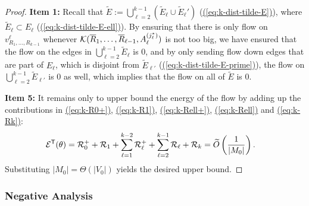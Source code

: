 \documentclass{article}
\newcommand{\eq}[1]{\hyperref[eq:#1]{(\ref*{eq:#1})}}
\renewcommand{\>}{\rangle}
\newcommand{\<}{\langle}
\renewcommand{\(}{\left(}
\renewcommand{\)}{\right)}
\begin{document}
\begin{proof}
\vskip7pt
\noindent\textbf{Item 1:} Recall that $\tilde{E}:=\bigcup_{\ell=2}^{k-1}(\tilde{E}_{\ell}\cup\tilde{E}_{\ell}')$ (\eq{k-dist-tilde-E}), where $\tilde{E}_{\ell}\subset E_{\ell}$ (\eq{k-dist-tilde-E-ell}). By ensuring that there is only flow on $v^{\ell}_{R_1,\dots,R_{k-1}}$ whenever ${\cal K}(\overline{R}_1,\dots,\overline{R}_{\ell-1},A_{\ell}^{(j_{\ell}^*)})$ is not too big, we have ensured that the flow on the edges in $\bigcup_{\ell=2}^{k-1}\tilde{E}_{\ell}$ is 0, and by only sending flow down edges that are part of $E_{\ell}$, which is disjoint from $\tilde{E}_{\ell'}$ (\eq{k-dist-tilde-E-prime}), the flow on $\bigcup_{\ell=2}^{k-1}\tilde{E}_{\ell'}$ is 0 as well, which implies that the flow on all of $\tilde{E}$ is 0.


\vskip7pt	
\noindent\textbf{Item 5:} It remains only to upper bound the energy of the flow by adding up the contributions in \eq{k-R0+}, \eq{k-R1}, \eq{k-Rell+}, \eq{k-Rell} and \eq{k-Rk}:
		\begin{align*}
			{\cal E}^{\sf T}(\theta) &={\cal R}_0^++{\cal R}_1+\sum_{\ell=1}^{k-2}{\cal R}_{\ell}^++\sum_{\ell=2}^{k-1}{\cal R}_{\ell}+{\cal R}_k
=
\widetilde{O}\left(\frac{1}{|M_0|}\right).
		\end{align*}
		Substituting $|M_0|=\Theta(|V_0|)$ yields the desired upper bound.
\end{proof}

\subsubsection{Negative Analysis}
\end{document}
